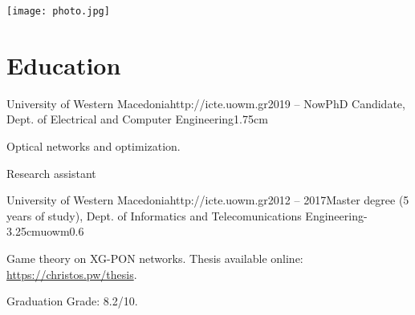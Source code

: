 \documentclass{mycv}
\begin{document}
	\thispagestyle{plain}
	\begin{minipage}{.7\textwidth}
		\begin{flushleft}
			\birth
		\end{flushleft}
	\end{minipage}
	\begin{minipage}{.3\textwidth}
		\begin{flushright}
			\texttt{[image: photo.jpg]}
		\end{flushright}
	\end{minipage}
	\vspace*{-0.75cm}
	\section{Education}

	\begin{EntryDated}{University of Western Macedonia}{http://icte.uowm.gr}{2019 -- Now}{PhD Candidate, Dept. of Electrical and Computer Engineering}{1.75cm}
	\begin{Itemize}
		\item Optical networks and optimization.
		\item Research assistant
	\end{Itemize}
	\end{EntryDated}
	
	\vspace*{0.5cm}
	
	\begin{EntryDatedLogo}{University of Western Macedonia}{http://icte.uowm.gr}{2012 -- 2017}{Master degree (5 years of study), Dept. of Informatics and Telecomunications Engineering}{-3.25cm}{uowm}{0.6}
		\begin{Itemize}
			\item Game theory on XG-PON networks. Thesis available online: \url{https://christos.pw/thesis}.
			\item Graduation Grade: 8.2/10.
		\end{Itemize}
	\end{EntryDatedLogo}
	
\end{document}
